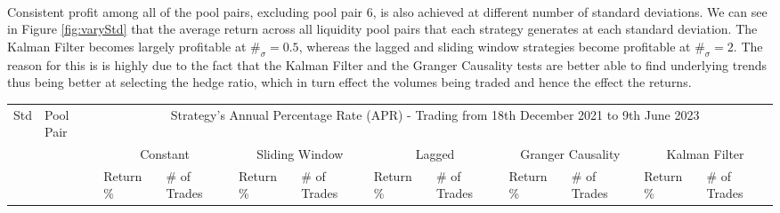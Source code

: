 \\[3mm]
Consistent profit among all of the pool pairs, excluding pool pair 6, is also achieved at different number of standard deviations. We can see in Figure \ref{fig:varyStd} that the average return across all liquidity pool pairs that each strategy generates at each standard deviation. The Kalman Filter becomes largely profitable at $\#_{\sigma} = 0.5$, whereas the lagged and sliding window strategies become profitable at $\#_{\sigma} = 2$. The reason for this is is highly due to the fact that the Kalman Filter and the Granger Causality tests are better able to find underlying trends thus being better at selecting the hedge ratio, which in turn effect the volumes being traded and hence the effect the returns.

\begin{table}[!htb]
    \centering
    \begin{adjustwidth}{-0.8in}{-0.9in}
        \begin{tabular}{|p{4em}|p{2em}|p{3em}|p{3em}|p{3em}|p{3em}|p{3em}|p{3em}|p{3em}|p{3em}|p{3em}|p{3em}|}\hline
            Std & Pool Pair & \multicolumn{10}{|c|}{Strategy's Annual Percentage Rate (APR) - Trading from 18th December 2021 to 9th June 2023} \\\cline{3-12}
            &   & \multicolumn{2}{|c|}{Constant} & \multicolumn{2}{|c|}{Sliding Window} & \multicolumn{2}{|c|}{Lagged} & \multicolumn{2}{|c|}{Granger Causality} & \multicolumn{2}{|c|}{Kalman Filter}\\\cline{3-12}
            & & Return \% & \# of Trades & Return \% & \# of Trades & Return \% & \# of Trades & Return \% & \# of Trades & Return \% & \# of Trades\\\hline


\end{tabular}
\end{adjustwidth}
\end{table}
